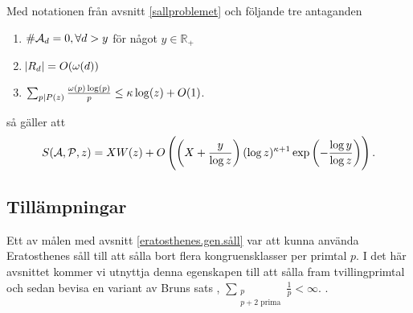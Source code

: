 \begin{theorem}\label{thm:EratosthenesSieve}
Med notationen från avsnitt \ref{sallproblemet} och följande tre antaganden 
\begin{enumerate}
    \item \(\card{\A_d} = 0, \forall d > y\) för något \(y \in \mathbb{R}_+\)
    \item \(\abs{R_d} = O(\omega(d))\)
    \item \(\sum_{p \divides P(z)} \frac{\omega(p) \log(p)}{p} \leq \kappa \log(z) + O(1)\).
\end{enumerate}
så gäller att
\begin{align*}
    \S{A}{P}{z} = X W(z) + O\left(\left(X + \frac{y}{\log z} \right) (\log z)^{\kappa + 1} \exp{\left(-\frac{\log y}{\log z}\right)} \right). 
\end{align*}

\end{theorem}


\subsection{Tillämpningar}


Ett av målen med avsnitt \ref{eratosthenes.gen.såll} var att kunna använda Eratosthenes såll till att sålla bort flera kongruensklasser per primtal $p$. I det här avsnittet kommer vi utnyttja denna egenskapen till att sålla fram tvillingprimtal och sedan bevisa en variant av Bruns sats \cite[Korollarium 5.4.5]{cojocarumurty}, \(\sum_{\substack{p \\ p + 2 \text{ prima}}} \frac{1}{p} < \infty\). . 

